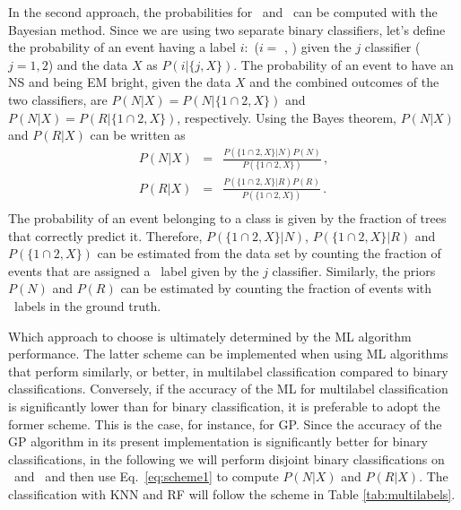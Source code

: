 In the second approach, the probabilities for \hasns\ and \hasrem\ can be computed with the Bayesian method. Since we are using two separate binary classifiers, let's define the probability of an event having a label $i$:~\true ($i=$ \hasns, \hasrem) given the $j$ classifier ($j= 1,2$) and the data $X$ as $P(i|\{j,X\})$. The probability of an event to have an \ac{NS} and being \ac{EM} bright, given the data $X$ and the combined outcomes of the two classifiers, are $P(N|X) = P(N|\{1\cap 2,X\})$ and $P(N|X) = P(R|\{1\cap 2,X\})$, respectively. Using the Bayes theorem, $P(N|X)$ and $P(R|X)$ can be written as
%
\begin{eqnarray}
P(N|X) &=&\frac{P(\{1\cap 2,X\}|N)P(N)}{P(\{1\cap 2,X\})}\,,\\
P(R|X) &=&\frac{P(\{1\cap 2,X\}|R)P(R)}{P(\{1\cap 2,X\})}\,.\\
\label{eq:scheme1}
\end{eqnarray}
%
The probability of an event belonging to a class is given by the fraction of trees that correctly predict it. Therefore, $P(\{1\cap 2,X\}|N)$, $P(\{1\cap 2,X\}|R)$ and $P(\{1\cap 2,X\})$ can be estimated from the data set by counting the fraction of events that are assigned a \true\ label given by the $j$ classifier. Similarly, the priors $P(N)$ and $P(R)$ can be estimated by counting the fraction of events with \true\ labels in the ground truth. 




Which approach to choose is ultimately determined by the \ac{ML} algorithm performance. The latter scheme can be implemented when using \ac{ML} algorithms that perform similarly, or
better, in multilabel classification compared to binary classifications. Conversely, if the accuracy of the \ac{ML} for multilabel classification is significantly lower than for binary
classification, it is preferable to adopt the former scheme. This is the case, for instance, for \ac{GP}. Since the accuracy of the \ac{GP} algorithm in its present implementation is
significantly better for binary classifications, in the following we will perform disjoint binary classifications on \hasns\ and \hasrem\ and then use Eq.~\ref{eq:scheme1} to compute
$P(N|X)$ and $P(R|X)$. The classification with \ac{KNN} and \ac{RF} will follow the scheme in Table \ref{tab:multilabels}. 
